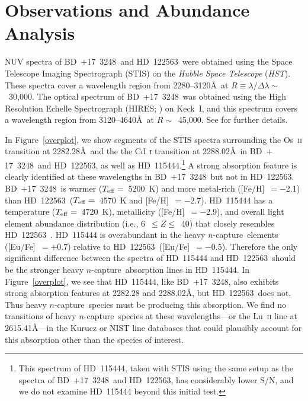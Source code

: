 \documentclass{emulateapj}
\def\bd{\mbox{BD~$+$17~3248}}
\def\hd{\mbox{HD~122563}}
\def\ncap{\mbox{$n$-capture}}
\begin{document}
\section{Observations and Abundance Analysis}
\label{analysis}


NUV spectra of \bd\ and \hd\
were obtained using the Space Telescope Imaging Spectrograph (STIS)
on the \textit{Hubble Space Telescope} (\textit{HST}). %
These spectra cover a wavelength region from 2280--3120\AA\ at 
$R \equiv \lambda/\Delta\lambda \sim$~30,000.
The optical spectrum of \bd\ was obtained using 
the High Resolution Echelle Spectrograph (HIRES; \citealt{vogt94})
on Keck~I, and this spectrum covers a 
wavelength region from 3120--4640\AA\ at
$R \sim$~45,000.
See \citet{cowan05} for further details.

In Figure~\ref{overplot}, we show segments of the STIS spectra
surrounding the Os~\textsc{ii} transition at 2282.28\AA\ and the
the Cd~\textsc{i} transition at 2288.02\AA\
in \bd\ and \hd, as well as \mbox{HD~115444}.\footnote{
This spectrum of \mbox{HD~115444}, taken with STIS using the 
same setup as the spectra of \bd\ and \hd,
has considerably lower S/N, and we 
do not examine \mbox{HD~115444} beyond this initial test.}
A strong absorption feature is clearly identified at these
wavelengths in \bd\ but not in \hd.
\bd\ is warmer ($T_{\rm eff} =$~5200~K)
and more metal-rich ([Fe/H]~$= -$2.1) than \hd\ 
($T_{\rm eff} =$~4570~K and [Fe/H]~$= -$2.7).
\mbox{HD~115444} has a temperature ($T_{\rm eff} =$~4720~K),
metallicity ([Fe/H]~$= -$2.9), and overall light element
abundance distribution (i.e., 6~$\leq Z \leq$~40)
that closely resembles \hd\ \citep{westin00}.
\mbox{HD~115444} is overabundant in the heavy
\ncap\ elements ([Eu/Fe]~$= +$0.7) relative to \hd\
([Eu/Fe]~$= -$0.5).
Therefore the only significant difference between the spectra of
\mbox{HD~115444} and \hd\ should be the stronger heavy \ncap\
absorption lines in \mbox{HD~115444}.
In Figure~\ref{overplot}, we see that \mbox{HD~115444}, like \bd, 
also exhibits strong absorption features at 2282.28 and 2288.02\AA,
but \hd\ does not.
Thus heavy \ncap\ species must be producing this absorption.
We find no transitions of heavy \ncap\ species 
at these wavelengths---or the Lu~\textsc{ii} line
at 2615.41\AA---in the Kurucz or NIST line databases that could plausibly
account for this absorption other than the species of interest.
\end{document}

